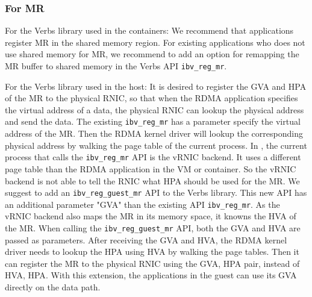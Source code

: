 \subsubsection{For MR}
For the Verbs library used in the containers: We recommend that applications register MR in the shared memory region. For existing applications who does not use shared memory for MR, we recommend to add an option for remapping the MR buffer to shared memory in the Verbs API \texttt{ibv\_reg\_mr}.

For the Verbs library used in the host: It is desired to register the GVA and HPA of the MR to the physical RNIC, so that when the RDMA application specifies the virtual address of a data, the physical RNIC can lookup the physical address and send the data.
The existing \texttt{ibv\_reg\_mr} has a parameter specify the virtual address of the MR. Then the RDMA kernel driver will lookup the corresponding physical address by walking the page table of the current process.
In \sys, the current process that calls the \texttt{ibv\_reg\_mr} API is the vRNIC backend. It uses a different page table than the RDMA application in the VM or container. So the vRNIC backend is not able to tell the RNIC what HPA should be used for the MR.
We suggest to add an \texttt{ibv\_reg\_guest\_mr} API to the Verbs library. This new API has an additional parameter "GVA" than the existing API \texttt{ibv\_reg\_mr}. As the vRNIC backend also maps the MR in its memory space, it knowns the HVA of the MR. When calling the \texttt{ibv\_reg\_guest\_mr} API, both the GVA and HVA are passed as parameters. After receiving the GVA and HVA, the RDMA kernel driver needs to lookup the HPA using HVA by walking the page tables. Then it can register the MR to the physical RNIC using the {GVA, HPA} pair, instead of {HVA, HPA}.
With this extension, the applications in the guest can use its GVA directly on the data path.
